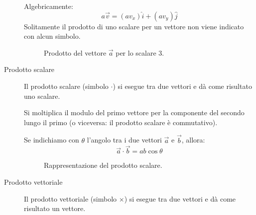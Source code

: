 \documentclass[a4paper,11pt,italian]{article}
\begin{document}
\begin{description}
  Algebricamente: 
  \[ a \vec{v} = (a v_x)\hat{i} + (a v_y)\hat{j} \]
  Solitamente il prodotto di uno scalare per un vettore non viene indicato con alcun simbolo.
  
\begin{figure}[htb]\centering
{}\caption{Prodotto del vettore $ \vec{a} $ per lo scalare $ 3 $.}
\label{img:prodottoscalarevettore}
\end{figure}
  
  \item[Prodotto scalare]
  Il prodotto scalare (simbolo $ \cdot $) si esegue tra due vettori e dà come risultato uno scalare.
  
  Si moltiplica il modulo del primo vettore per la componente del secondo lungo il primo (o viceversa: il prodotto scalare è commutativo).
  
  Se indichiamo con $ \theta $ l'angolo tra i due vettori $ \vec{a} $ e $ \vec{b} $, allora: 
  \[ \vec{a} \cdot \vec{b} = ab\cos\theta \]

\begin{figure}[htb]\centering
{}\caption{Rappresentazione del prodotto scalare.}
\end{figure}

  
  \item[Prodotto vettoriale]
  Il prodotto vettoriale (simbolo $ \times  $) si esegue tra due vettori e dà come risultato un vettore.
  

\end{description}
\end{document}
